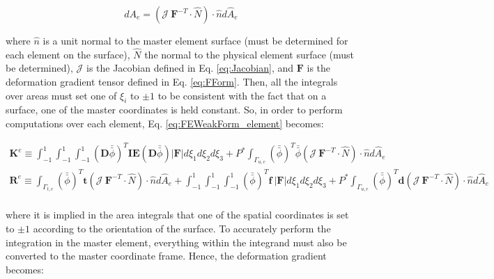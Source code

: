 \documentclass[10pt]{article}
\begin{document}
\begin{equation}
\label{eq:Nanson}
dA_e=(\mathscr{J}\ \textbf{F}^{-T}\cdot\hat{N})\cdot\hat{n}d\hat{A}_e
\end{equation}

where \(\hat{n}\) is a unit normal to the master element surface (must be determined for each element on the surface), \(\hat{N}\) the normal to the physical element surface (must be determined), \(\mathscr{J}\) is the Jacobian defined in Eq. \eqref{eq:Jacobian}, and \(\textbf{F}\) is the deformation gradient tensor defined in Eq. \eqref{eq:FForm}. Then, all the integrals over areas must set one of \(\xi_i\) to \(\pm1\) to be consistent with the fact that on a surface, one of the master coordinates is held constant. So, in order to perform computations over each element, Eq. \eqref{eq:FEWeakForm_element} becomes:

\begin{equation}
\label{eq:FEWeakForm_element}
\begin{aligned}
\textbf{K}^e\equiv\int_{-1}^{1}\int_{-1}^{1}\int_{-1}^{1}(\textbf{D}\bar{\bar{\phi}})^T\textbf{IE}(\textbf{D}\bar{\bar{\phi}})|\textbf{F}|d\xi_1d\xi_2d\xi_3 +P^{*}\int_{\Gamma_{u,e}}(\bar{\bar{\phi}})^T\bar{\bar{\phi}}(\mathscr{J}\ \textbf{F}^{-T}\cdot\hat{N})\cdot\hat{n}d\hat{A}_e\\
\textbf{R}^e\equiv\int_{\Gamma_{t,e}}(\bar{\bar{\phi}})^T\textbf{t}(\mathscr{J}\ \textbf{F}^{-T}\cdot\hat{N})\cdot\hat{n}d\hat{A}_e+\int_{-1}^{1}\int_{-1}^{1}\int_{-1}^{1}(\bar{\bar{\phi}})^T\textbf{f}\ |\textbf{F}|d\xi_1d\xi_2d\xi_3+P^{*}\int_{\Gamma_{u,e}}(\bar{\bar{\phi}})^T\textbf{d}(\mathscr{J}\ \textbf{F}^{-T}\cdot\hat{N})\cdot\hat{n}d\hat{A}_e\\
\end{aligned}
\end{equation}

where it is implied in the area integrals that one of the spatial coordinates is set to \(\pm 1\) according to the orientation of the surface. To accurately perform the integration in the master element, everything within the integrand must also be converted to the master coordinate frame. Hence, the deformation gradient becomes:
\end{document}
